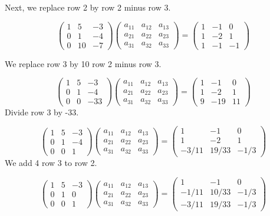 \documentclass[
]{book}
\theoremstyle{definition}
\theoremstyle{definition}
\theoremstyle{definition}
\theoremstyle{definition}
\theoremstyle{remark}
\begin{document}
Next, we replace row 2 by row 2 minus row 3.

\[ \begin{pmatrix}1 & 5 & -3\\ 0 & 1 & -4\\ 0 & 10 & -7 \end{pmatrix}\begin{pmatrix} a_{11} & a_{12} & a_{13}\\  a_{21} & a_{22} & a_{23}\\  a_{31} & a_{32} & a_{33}\end{pmatrix} = \begin{pmatrix}1 & -1 & 0\\ 1 & -2 & 1\\ 1 & -1 & -1 \end{pmatrix}\]

We replace row 3 by 10 row 2 minus row 3.

\[ \begin{pmatrix}1 & 5 & -3\\ 0 & 1 & -4\\ 0 & 0 & -33 \end{pmatrix}\begin{pmatrix} a_{11} & a_{12} & a_{13}\\  a_{21} & a_{22} & a_{23}\\  a_{31} & a_{32} & a_{33}\end{pmatrix} = \begin{pmatrix}1 & -1 & 0\\ 1 & -2 & 1\\ 9 & -19 & 11 \end{pmatrix}\]
Divide row 3 by -33.

\[ \begin{pmatrix}1 & 5 & -3\\ 0 & 1 & -4\\ 0 & 0 & 1 \end{pmatrix}\begin{pmatrix} a_{11} & a_{12} & a_{13}\\  a_{21} & a_{22} & a_{23}\\  a_{31} & a_{32} & a_{33}\end{pmatrix} = \begin{pmatrix}1 & -1 & 0\\ 1 & -2 & 1\\ -3/11 & 19/33 & -1/3 \end{pmatrix}\]
We add 4 row 3 to row 2.

\[ \begin{pmatrix}1 & 5 & -3\\ 0 & 1 & 0\\ 0 & 0 & 1 \end{pmatrix}\begin{pmatrix} a_{11} & a_{12} & a_{13}\\  a_{21} & a_{22} & a_{23}\\  a_{31} & a_{32} & a_{33}\end{pmatrix} = \begin{pmatrix}1 & -1 & 0\\ -1/11 & 10/33 & -1/3\\ -3/11 & 19/33 & -1/3 \end{pmatrix}\]
\end{document}
